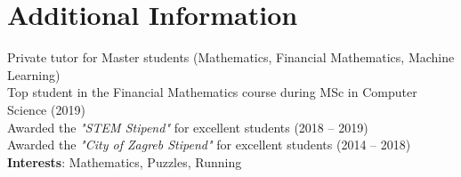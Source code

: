 \documentclass[letterpaper,10pt]{article}
\begin{document}
\section{Additional Information}
\begin{itemize}[leftmargin=0.15in, label={}]
  \small{\item{
  	 Private tutor for Master students (Mathematics, Financial Mathematics, Machine Learning)\\
     Top student in the Financial Mathematics course during MSc in Computer Science (2019) \\
     Awarded the \textit{"STEM Stipend"} for excellent students (2018 -- 2019) \\
     Awarded the \textit{"City of Zagreb Stipend"} for excellent students (2014 -- 2018) \\ \vspace{3pt}
     \textbf{Interests}: Mathematics, Puzzles, Running
    }}
\end{itemize}


\end{document}
